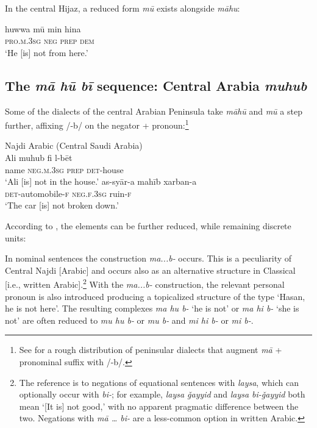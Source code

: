 \documentclass[output=paper,colorlinks,citecolor=brown]{langscibook}
\begin{document}
In the central Hijaz, a reduced form \textit{mū} exists alongside \textit{māhu}:

\ea \label{ex:WiAR-32}
	\gll huwwa mū min hina \\
	\textsc{pro.m.3sg} \textsc{neg} \textsc{prep} \textsc{dem}\\
	\glt ‘He [is] not from here.’ \citep[41]{omar1975a}
\z

\subsection{The \textit{mā hū bī} sequence: Central Arabia \textit{muhub}} \label{s:WiAR-4.4}

Some of the dialects of the central Arabian Peninsula take \textit{māhū} and \textit{mū} a step further, affixing /-b/ on the negator + pronoun:\footnote{See \citet[127]{prochazka2010a} for a rough distribution of peninsular dialects that augment \textit{mā}  + pronominal suffix with /-b/.}

\newpage
\ea Najdi Arabic (Central Saudi Arabia)\label{ex:WiAR-33}\\
  \ea
  	\gll Ali muhub fi l-bēt\\
  	name \textsc{neg.m.3sg} \textsc{prep} \textsc{det}-house\\
  	\glt ‘Ali [is] not in the house.’ \citep[75]{binturki2015a}
  \ex
  	\gll as-syār-a mahīb xarban-a\\
  	\textsc{det}-automobile-\textsc{f} \textsc{neg.f.3sg} ruin-\textsc{f}\\
  	\glt ‘The car [is] not broken down.’ \citep[76]{binturki2015a}
\z \z


According to \citet{ingham1994a}, the elements can be further reduced, while remaining discrete units:

\begin{displayquote}
    In nominal sentences the construction \textit{ma...b-} occurs. This is a peculiarity of Central Najdi [Arabic] and occurs also as an alternative structure in Classical [i.e., written Arabic].\footnote{The reference is to negations of equational sentences with \textit{laysa}, which can optionally occur with \textit{bi-}; for example, \textit{laysa ǧayyid} and \textit{laysa bi-ǧayyid} both mean ‘[It is] not good,’ with no apparent pragmatic difference between the two. Negations with \textit{mā … bi-} are a less-common option in written Arabic.} With the \textit{ma...b-} construction, the relevant personal pronoun is also introduced producing a topicalized structure of the type ‘Hasan, he is not here’. The resulting complexes \textit{ma hu b-} ‘he is not’ or \textit{ma hi b-} ‘she is not’ are often reduced to \textit{mu hu b-} or \textit{mu b-} and \textit{mi hi b-} or \textit{mi b-}. \citep{ingham1994a}
\end{displayquote}
\end{document}
